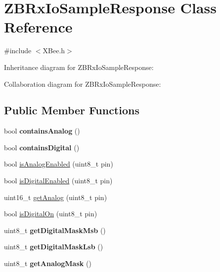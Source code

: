 \hypertarget{class_z_b_rx_io_sample_response}{}\section{Z\+B\+Rx\+Io\+Sample\+Response Class Reference}
\label{class_z_b_rx_io_sample_response}


{\ttfamily \#include $<$X\+Bee.\+h$>$}



Inheritance diagram for Z\+B\+Rx\+Io\+Sample\+Response\+:


Collaboration diagram for Z\+B\+Rx\+Io\+Sample\+Response\+:
\subsection*{Public Member Functions}
\begin{DoxyCompactItemize}
\item 
\hypertarget{class_z_b_rx_io_sample_response_ae1e501e3e940a1b199955d5c938e8970}{}\label{class_z_b_rx_io_sample_response_ae1e501e3e940a1b199955d5c938e8970} 
bool {\bfseries contains\+Analog} ()
\item 
\hypertarget{class_z_b_rx_io_sample_response_a12d70fd07c66e37ea06d8ae92672d320}{}\label{class_z_b_rx_io_sample_response_a12d70fd07c66e37ea06d8ae92672d320} 
bool {\bfseries contains\+Digital} ()
\item 
bool \hyperlink{class_z_b_rx_io_sample_response_ad0e444cc8854c996517c1ecde033a9c8}{is\+Analog\+Enabled} (uint8\+\_\+t pin)
\item 
bool \hyperlink{class_z_b_rx_io_sample_response_a946c653da11f62b319c3ca6606f8edff}{is\+Digital\+Enabled} (uint8\+\_\+t pin)
\item 
uint16\+\_\+t \hyperlink{class_z_b_rx_io_sample_response_aa74edf46988bd3e50ce4037350cbb91e}{get\+Analog} (uint8\+\_\+t pin)
\item 
bool \hyperlink{class_z_b_rx_io_sample_response_ac94f045360d7dbb009ac16bc437cbbd5}{is\+Digital\+On} (uint8\+\_\+t pin)
\item 
\hypertarget{class_z_b_rx_io_sample_response_af15dc5e0954ece81bb28b33316ad0fcd}{}\label{class_z_b_rx_io_sample_response_af15dc5e0954ece81bb28b33316ad0fcd} 
uint8\+\_\+t {\bfseries get\+Digital\+Mask\+Msb} ()
\item 
\hypertarget{class_z_b_rx_io_sample_response_a2bc101d5276c92f09ebe3a2f370ad0c2}{}\label{class_z_b_rx_io_sample_response_a2bc101d5276c92f09ebe3a2f370ad0c2} 
uint8\+\_\+t {\bfseries get\+Digital\+Mask\+Lsb} ()
\item 
\hypertarget{class_z_b_rx_io_sample_response_a065e15e00c505045a13e95091a62fae5}{}\label{class_z_b_rx_io_sample_response_a065e15e00c505045a13e95091a62fae5} 
uint8\+\_\+t {\bfseries get\+Analog\+Mask} ()
\end{DoxyCompactItemize}
